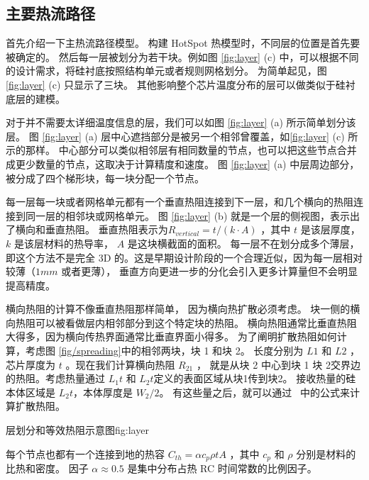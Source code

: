 \subsection{主要热流路径}\label{sec:primary}

首先介绍一下主热流路径模型。
构建 HotSpot 热模型时，不同层的位置是首先要被确定的。
然后每一层被划分为若干块。例如图 \ref{fig:layer} (c) 中，可以根据不同的设计需求，将硅衬底按照结构单元或者规则网格划分。
为简单起见，图 \ref{fig:layer} (c) 只显示了三块。
其他影响整个芯片温度分布的层可以做类似于硅衬底层的建模。

对于并不需要太详细温度信息的层，我们可以如图 \ref{fig:layer} (a) 所示简单划分该层。
图 \ref{fig:layer} (a) 层中心遮挡部分是被另一个相邻曾覆盖，如\ref{fig:layer} (c) 所示的那样。
中心部分可以类似相邻层有相同数量的节点，也可以把这些节点合并成更少数量的节点，这取决于计算精度和速度。
图 \ref{fig:layer} (a) 中层周边部分，被分成了四个梯形块，每一块分配一个节点。

每一层每一块或者网格单元都有一个垂直热阻连接到下一层，和几个横向的热阻连接到同一层的相邻块或网格单元。
图 \ref{fig:layer} (b) 就是一个层的侧视图，表示出了横向和垂直热阻。
垂直热阻表示为$R_{vertical} = t/(k \cdot A)$ ，其中 $t$ 是该层厚度， $k$ 是该层材料的热导率， $A$ 是这块横截面的面积。
每一层不在划分成多个薄层，即这个方法不是完全 3D 的。这是早期设计阶段的一个合理近似，因为每一层相对较薄（$1 mm$ 或者更薄），
垂直方向更进一步的分化会引入更多计算量但不会明显提高精度。


 
横向热阻的计算不像垂直热阻那样简单，
因为横向热扩散必须考虑。
块一侧的横向热阻可以被看做层内相邻部分到这个特定块的热阻。
横向热阻通常比垂直热阻大得多，因为横向传热界面通常比垂直界面小得多。
为了阐明扩散热阻如何计算，考虑图 \ref{fig/spreading}中的相邻两块，块 1 和块 2。
长度分别为 $L1$ 和 $L2$ ，芯片厚度为 $t$ 。现在我们计算横向热阻 $R_{21}$ ， 
就是从块 2 中心到块 1 块 2交界边的热阻。考虑热量通过 $L_1t$ 和 $L_2t$定义的表面区域从块1传到块2。
接收热量的硅本体区域是 $L_2t$，本体厚度是 $W_2/2$。
有这些量之后，就可以通过~\cite{song1995constriction} 中的公式来计算扩散热阻。

 \begin{pics}{层划分和等效热阻示意图}{fig:layer}
 \end{pics}

每个节点也都有一个连接到地的热容 $C_{th} = \alpha c_p \rho t A$ ，其中 $c_p$ 和 $\rho$ 分别是材料的比热和密度。
因子  $\alpha \approx 0.5$ 是集中分布占热 RC 时间常数的比例因子。

